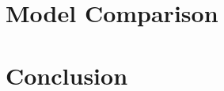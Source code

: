\documentclass{llncs}
\begin{document}



\section{Model Comparison}
\label{sec:model-comparison}




\section{Conclusion}
\label{sec:conclusion}






\end{document}
